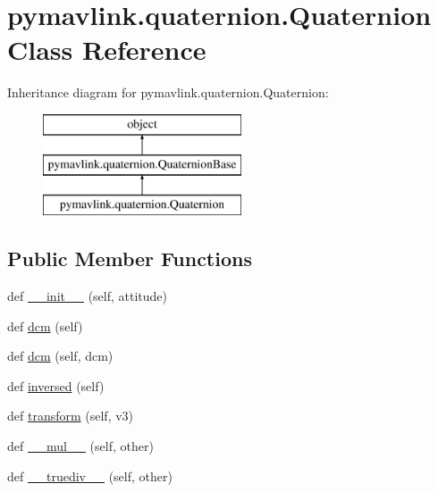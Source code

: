 \hypertarget{classpymavlink_1_1quaternion_1_1Quaternion}{}\section{pymavlink.\+quaternion.\+Quaternion Class Reference}
\label{classpymavlink_1_1quaternion_1_1Quaternion}
Inheritance diagram for pymavlink.\+quaternion.\+Quaternion\+:\begin{figure}[H]
\begin{center}
\leavevmode
\includegraphics[height=3.000000cm]{classpymavlink_1_1quaternion_1_1Quaternion}
\end{center}
\end{figure}
\subsection*{Public Member Functions}
\begin{DoxyCompactItemize}
\item 
def \hyperlink{classpymavlink_1_1quaternion_1_1Quaternion_ad82c01c2f6c5edc2e25d367624f565c5}{\+\_\+\+\_\+init\+\_\+\+\_\+} (self, attitude)
\item 
def \hyperlink{classpymavlink_1_1quaternion_1_1Quaternion_a8c596178af38be093dd787c609d7da09}{dcm} (self)
\item 
def \hyperlink{classpymavlink_1_1quaternion_1_1Quaternion_a2223bcf5392e9fc3980e012074318707}{dcm} (self, dcm)
\item 
def \hyperlink{classpymavlink_1_1quaternion_1_1Quaternion_a0dd030159c7d726fad2cb12fd4c3983a}{inversed} (self)
\item 
def \hyperlink{classpymavlink_1_1quaternion_1_1Quaternion_a79b86f00f3500a6c34fa3a099f3714f7}{transform} (self, v3)
\item 
def \hyperlink{classpymavlink_1_1quaternion_1_1Quaternion_af3d7ea873b5cc8bea69d2664b8e6dcc9}{\+\_\+\+\_\+mul\+\_\+\+\_\+} (self, other)
\item 
def \hyperlink{classpymavlink_1_1quaternion_1_1Quaternion_a768c82f6b6fbb4e9c3a496e494a0c587}{\+\_\+\+\_\+truediv\+\_\+\+\_\+} (self, other)
\end{DoxyCompactItemize}
